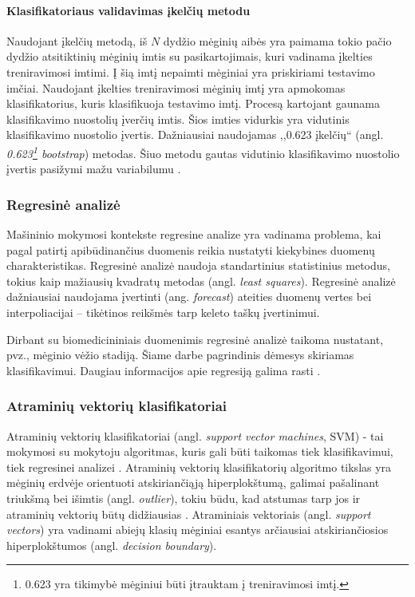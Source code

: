 \paragraph{Klasifikatoriaus validavimas įkelčių metodu}

Naudojant įkelčių metodą, iš $N$ dydžio mėginių aibės yra paimama tokio pačio dydžio atsitiktinių mėginių imtis su pasikartojimais, kuri vadinama įkelties treniravimosi imtimi. Į šią imtį nepaimti mėginiai yra priskiriami testavimo imčiai. Naudojant įkelties treniravimosi mėginių imtį yra apmokomas klasifikatorius, kuris klasifikuoja testavimo imtį. Procesą kartojant gaunama klasifikavimo nuostolių įverčių imtis. Šios imties vidurkis yra vidutinis klasifikavimo nuostolio įvertis. Dažniausiai naudojamas ,,0.623 įkelčių`` (angl. \textit{0.623\footnote{0.623 yra tikimybė mėginiui būti įtrauktam į treniravimosi imtį.} bootstrap}) metodas. Šiuo metodu gautas vidutinio klasifikavimo nuostolio įvertis pasižymi mažu variabilumu \cite{michie1994machine}.

\subsubsection{Regresinė analizė}

Mašininio mokymosi kontekste regresine analize yra vadinama problema, kai pagal patirtį apibūdinančius duomenis reikia nustatyti kiekybines duomenų charakteristikas. Regresinė analizė naudoja standartinius statistinius metodus, tokius kaip mažiausių kvadratų metodas (angl. \textit{least squares}). Regresinė analizė dažniausiai naudojama įvertinti (ang. \textit{forecast}) ateities duomenų vertes bei interpoliacijai -- tikėtinos reikšmės tarp keleto taškų įvertinimui. 

Dirbant su biomedicininiais duomenimis regresinė analizė taikoma nustatant, pvz., mėginio vėžio stadiją. Šiame darbe pagrindinis dėmesys skiriamas klasifikavimui. Daugiau informacijos apie regresiją galima rasti \cite{gelman2007data}.

\subsubsection{Atraminių vektorių klasifikatoriai}

Atraminių vektorių klasifikatoriai (angl. \textit{support vector machines}, SVM) - tai mokymosi su mokytoju algoritmas, kuris gali būti taikomas tiek klasifikavimui, tiek regresinei analizei \cite{vapnik2000nature}. Atraminių vektorių klasifikatorių algoritmo tikslas yra mėginių erdvėje orientuoti atskiriančiąją hiperplokštumą, galimai pašalinant triukšmą bei išimtis (angl. \textit{outlier}), tokiu būdu, kad atstumas tarp jos ir atraminių vektorių būtų didžiausias \cite{cortes1995support}. Atraminiais vektoriais (angl. \textit{support vectors}) yra vadinami abiejų klasių mėginiai esantys arčiausiai atskiriančiosios hiperplokštumos (angl. \textit{decision boundary}).

